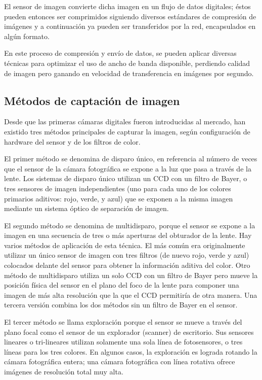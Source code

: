 \documentclass[12pt,a4papert,woside,openright,titlepage,final]{book}
\begin{document}
El sensor de imagen convierte dicha imagen en un flujo de datos
digitales; éstos pueden entonces ser comprimidos siguiendo diversos
estándares de compresión de imágenes y a continuación ya pueden
ser transferidos por la red, encapsulados en algún formato.

En este proceso de compresión y envío de datos, se pueden aplicar
diversas técnicas para optimizar el uso de ancho de banda disponible,
perdiendo calidad de imagen pero ganando en velocidad de
transferencia en imágenes por segundo.

\subsection{Métodos de captación de imagen}

Desde que las primeras cámaras digitales fueron introducidas al mercado, han
existido tres métodos principales de capturar la imagen, según configuración de
hardware del sensor y de los filtros de color.

El primer método se denomina de disparo único, en referencia al número de veces
que el sensor de la cámara fotográfica se expone a la luz que pasa a través de
la lente. Los sistemas de disparo único utilizan un CCD con un filtro de Bayer,
o tres sensores de imagen independientes (uno para cada uno de los colores
primarios aditivos: rojo, verde, y azul) que se exponen a la misma imagen
mediante un sistema óptico de separación de imagen.

El segundo método se denomina de multidisparo, porque el sensor se expone a la
imagen en una secuencia de tres o más aperturas del obturador de la lente. Hay
varios métodos de aplicación de esta técnica. El más común era originalmente
utilizar un único sensor de imagen con tres filtros (de nuevo rojo, verde y
azul) colocados delante del sensor para obtener la información aditiva del
color. Otro método de multidisparo utiliza un solo CCD con un filtro de Bayer
pero mueve la posición física del sensor en el plano del foco de la lente para
componer una imagen de más alta resolución que la que el CCD permitiría de otra
manera. Una tercera versión combina los dos métodos sin un filtro de Bayer en el
sensor.

El tercer método se llama exploración porque el sensor se mueve a través del
plano focal como el sensor de un explorador (scanner) de escritorio. Sus
sensores lineares o tri-lineares utilizan solamente una sola línea de
fotosensores, o tres líneas para los tres colores. En algunos casos, la
exploración es lograda rotando la cámara fotográfica entera; una cámara
fotográfica con línea rotativa ofrece imágenes de resolución total muy alta.
\end{document}
